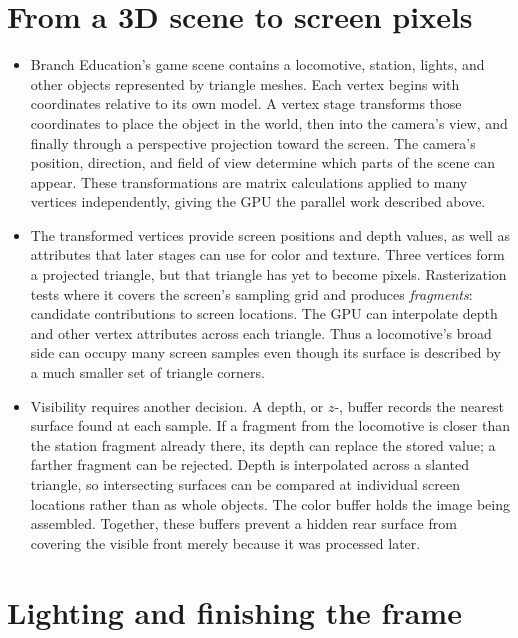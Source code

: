 \documentclass[10pt]{article}
\begin{document}
\newpage
\section*{From a 3D scene to screen pixels}

\begin{itemize}[leftmargin=1.25em, itemsep=0.3em, parsep=0pt, topsep=0pt]
    \item Branch Education's game scene contains a locomotive, station, lights, and other objects represented by triangle meshes. Each vertex begins with coordinates relative to its own model. A vertex stage transforms those coordinates to place the object in the world, then into the camera's view, and finally through a perspective projection toward the screen. The camera's position, direction, and field of view determine which parts of the scene can appear. These transformations are matrix calculations applied to many vertices independently, giving the GPU the parallel work described above.

    \item The transformed vertices provide screen positions and depth values, as well as attributes that later stages can use for color and texture. Three vertices form a projected triangle, but that triangle has yet to become pixels. Rasterization tests where it covers the screen's sampling grid and produces \textit{fragments}: candidate contributions to screen locations. The GPU can interpolate depth and other vertex attributes across each triangle. Thus a locomotive's broad side can occupy many screen samples even though its surface is described by a much smaller set of triangle corners.

    \item Visibility requires another decision. A depth, or \(z\)-, buffer records the nearest surface found at each sample. If a fragment from the locomotive is closer than the station fragment already there, its depth can replace the stored value; a farther fragment can be rejected. Depth is interpolated across a slanted triangle, so intersecting surfaces can be compared at individual screen locations rather than as whole objects. The color buffer holds the image being assembled. Together, these buffers prevent a hidden rear surface from covering the visible front merely because it was processed later.
\end{itemize}

\section*{Lighting and finishing the frame}
\end{document}
